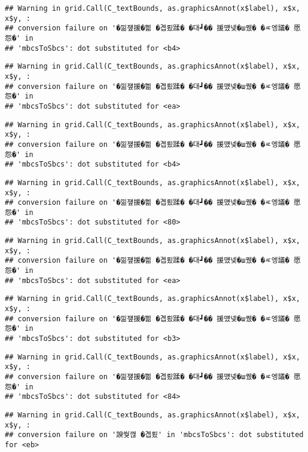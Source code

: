 \documentclass[
]{article}
\begin{document}
\begin{verbatim}
## Warning in grid.Call(C_textBounds, as.graphicsAnnot(x$label), x$x, x$y, :
## conversion failure on '�낆쟾援�쁾 �곕룄蹂� �대┛�� 援먰넻�ш퀬� �ㅼ엥議� 愿怨�' in
## 'mbcsToSbcs': dot substituted for <b4>
\end{verbatim}

\begin{verbatim}
## Warning in grid.Call(C_textBounds, as.graphicsAnnot(x$label), x$x, x$y, :
## conversion failure on '�낆쟾援�쁾 �곕룄蹂� �대┛�� 援먰넻�ш퀬� �ㅼ엥議� 愿怨�' in
## 'mbcsToSbcs': dot substituted for <ea>
\end{verbatim}

\begin{verbatim}
## Warning in grid.Call(C_textBounds, as.graphicsAnnot(x$label), x$x, x$y, :
## conversion failure on '�낆쟾援�쁾 �곕룄蹂� �대┛�� 援먰넻�ш퀬� �ㅼ엥議� 愿怨�' in
## 'mbcsToSbcs': dot substituted for <b4>
\end{verbatim}

\begin{verbatim}
## Warning in grid.Call(C_textBounds, as.graphicsAnnot(x$label), x$x, x$y, :
## conversion failure on '�낆쟾援�쁾 �곕룄蹂� �대┛�� 援먰넻�ш퀬� �ㅼ엥議� 愿怨�' in
## 'mbcsToSbcs': dot substituted for <80>
\end{verbatim}

\begin{verbatim}
## Warning in grid.Call(C_textBounds, as.graphicsAnnot(x$label), x$x, x$y, :
## conversion failure on '�낆쟾援�쁾 �곕룄蹂� �대┛�� 援먰넻�ш퀬� �ㅼ엥議� 愿怨�' in
## 'mbcsToSbcs': dot substituted for <ea>
\end{verbatim}

\begin{verbatim}
## Warning in grid.Call(C_textBounds, as.graphicsAnnot(x$label), x$x, x$y, :
## conversion failure on '�낆쟾援�쁾 �곕룄蹂� �대┛�� 援먰넻�ш퀬� �ㅼ엥議� 愿怨�' in
## 'mbcsToSbcs': dot substituted for <b3>
\end{verbatim}

\begin{verbatim}
## Warning in grid.Call(C_textBounds, as.graphicsAnnot(x$label), x$x, x$y, :
## conversion failure on '�낆쟾援�쁾 �곕룄蹂� �대┛�� 援먰넻�ш퀬� �ㅼ엥議� 愿怨�' in
## 'mbcsToSbcs': dot substituted for <84>
\end{verbatim}

\begin{verbatim}
## Warning in grid.Call(C_textBounds, as.graphicsAnnot(x$label), x$x, x$y, :
## conversion failure on '諛쒖깮 �곕룄' in 'mbcsToSbcs': dot substituted for <eb>
\end{verbatim}
\end{document}
